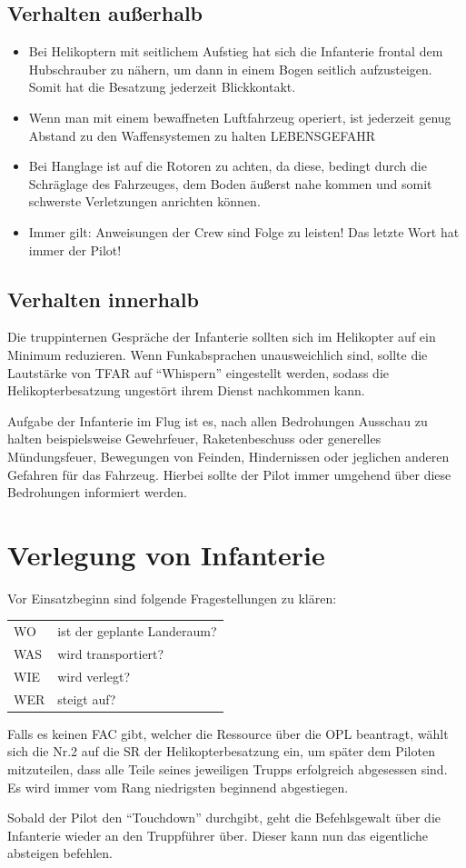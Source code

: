 \subsection{Verhalten außerhalb}
	\begin{itemize}
		\item Bei Helikoptern mit seitlichem Aufstieg hat sich die Infanterie frontal dem  
		Hubschrauber zu nähern, um dann in einem Bogen seitlich aufzusteigen. Somit hat 
		die Besatzung jederzeit Blickkontakt.  
		\item Wenn man mit einem bewaffneten Luftfahrzeug operiert, ist jederzeit genug Abstand 
		zu den Waffensystemen zu halten LEBENSGEFAHR
		\item Bei Hanglage ist auf die Rotoren zu achten, da diese, bedingt durch die Schräglage  
		des Fahrzeuges, dem Boden äußerst nahe kommen und somit schwerste 
		Verletzungen anrichten können. 
		\item Immer gilt: Anweisungen der Crew sind Folge zu leisten! Das letzte Wort hat immer  
		der Pilot! 
	\end{itemize}
\subsection{Verhalten innerhalb}
	Die truppinternen Gespräche der Infanterie sollten sich im Helikopter auf ein Minimum reduzieren. Wenn Funkabsprachen unausweichlich sind, sollte die Lautstärke von TFAR auf “Whispern” eingestellt werden, sodass die Helikopterbesatzung ungestört ihrem Dienst nachkommen kann.\par
	Aufgabe der Infanterie im Flug ist es, nach allen Bedrohungen Ausschau zu halten beispielsweise Gewehrfeuer, Raketenbeschuss oder generelles Mündungsfeuer, Bewegungen von Feinden, Hindernissen oder jeglichen anderen Gefahren für das Fahrzeug. Hierbei sollte der Pilot immer umgehend über diese Bedrohungen informiert werden.

\section{Verlegung von Infanterie}
	Vor Einsatzbeginn sind folgende Fragestellungen zu klären:
	\par\medskip
	\begin{tabular}{ll}
	WO  & ist der geplante Landeraum?\\ 
	WAS  & wird transportiert?\\ 
	WIE  & wird verlegt?\\ 
	WER  & steigt auf?\\ 
	\end{tabular}
	\par\medskip
	Falls es keinen FAC gibt, welcher die Ressource über die OPL beantragt, wählt sich die Nr.2 auf die SR der Helikopterbesatzung ein, um später dem Piloten mitzuteilen, dass alle Teile seines jeweiligen Trupps erfolgreich abgesessen sind. Es wird immer vom Rang niedrigsten beginnend abgestiegen.\par
	Sobald der Pilot den “Touchdown” durchgibt, geht die Befehlsgewalt über die Infanterie wieder an den Truppführer über. Dieser kann nun das eigentliche absteigen befehlen.

